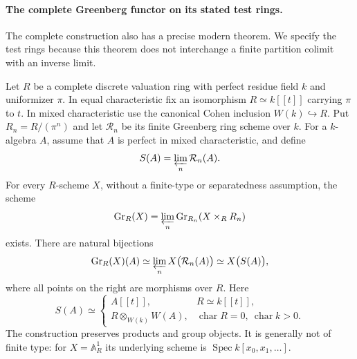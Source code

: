 \paragraph{The complete Greenberg functor on its stated test rings.}
The complete construction also has a precise modern theorem.  We specify
the test rings because this theorem does not interchange a finite
partition colimit with an inverse limit.

\begin{theorem}\label{B:complete-Greenberg-points}
Let $R$ be a complete discrete valuation ring with perfect residue field
$k$ and uniformizer $\pi$.  In equal characteristic fix an isomorphism
$R\simeq k[[t]]$ carrying $\pi$ to $t$.  In mixed characteristic use the
canonical Cohen inclusion $W(k)\hookrightarrow R$.  Put $R_n=R/(\pi^n)$
and let $\mathcal R_n$ be its finite Greenberg ring scheme over $k$.
For a $k$-algebra $A$, assume that $A$ is perfect in mixed characteristic,
and define
\[
 S(A)=\varprojlim_n\mathcal R_n(A).
\]
For every $R$-scheme $X$, without a finite-type or separatedness assumption,
the scheme
\[
 \operatorname{Gr}_R(X)=
 \varprojlim_n\operatorname{Gr}_{R_n}(X\times_R R_n)
\]
exists.  There are natural bijections
\[
 \operatorname{Gr}_R(X)(A)
 \simeq\varprojlim_n X\bigl(\mathcal R_n(A)\bigr)
 \simeq X\bigl(S(A)\bigr),
\]
where all points on the right are morphisms over $R$.  Here
\[
 S(A)\simeq
 \begin{cases}
 A[[t]],&R\simeq k[[t]],\\
 R\otimes_{W(k)}W(A),&\operatorname{char}R=0,\ \operatorname{char}k>0.
 \end{cases}
\]
The construction preserves products and group objects.  It is generally
not of finite type: for $X=\mathbb A^1_R$ its underlying scheme is
$\operatorname{Spec}k[x_0,x_1,\ldots]$.
\end{theorem}

